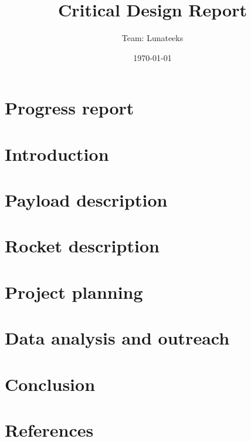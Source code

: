 \documentclass[11pt]{article}
\title{Critical Design Report}
\author{Team: Lunateeks}
\date{\today}
\begin{document}
\cansattitle

\tableofcontents
\pagestyle{plain}

\newpage

\section{Progress report}



\section{Introduction}



\section{Payload description}



\section{Rocket description}



\section{Project planning}



\section{Data analysis and outreach}



\section{Conclusion}



\section{References}


\end{document}
